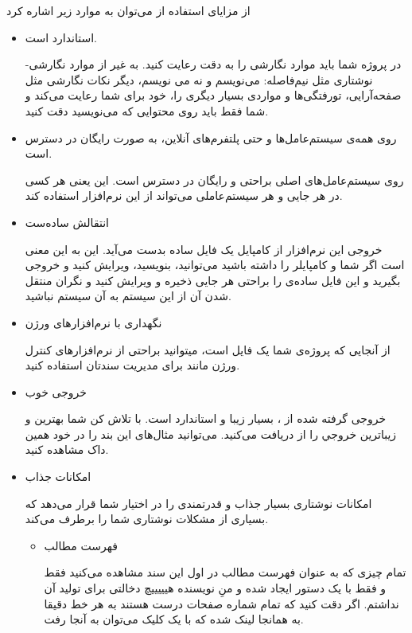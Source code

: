   از مزایای استفاده از \lr{\LaTeX } می‌توان به موارد زیر اشاره کرد
  \begin{itemize}
  	\item 
  	{\large استاندارد است.}
  	
  	در پروژه شما باید موارد نگارشی را به دقت رعایت کنید. به غیر از موارد نگارشی-نوشتاری مثل نیم‌فاصله:‌ می‌‌نویسم و نه می نویسم، دیگر نکات نگارشی مثل صفحه‌آرایی، تورفتگی‌ها و مواردی بسیار دیگری را، خود \lr{\LaTeX } برای شما رعایت می‌کند و شما فقط باید روی محتوایی که می‌نویسید دقت کنید.
  	\item 
    {\large روی همه‌ی سیستم‌عامل‌ها و حتی پلتفرم‌های آنلاین، به صورت رایگان در دسترس است.}
    
    \lr{\LaTeX }
     روی سیستم‌عامل‌های اصلی 
     براحتی و رایگان در دسترس است. این یعنی هر کسی در هر جایی و هر سیستم‌عاملی می‌تواند از این نرم‌افزار استفاده کند.
  	\item 
  	{\large انتقالش ساده‌ست}
  	
  	خروجی این نرم‌افزار از کامپایل یک فایل  ساده بدست می‌آید. این به این معنی است اگر شما  و کامپایلر 
  	\lr{\LaTeX}
  	را داشته باشید می‌توانید، بنویسید، ویرایش کنید و خروجی بگیرید و این فایل ساده‌ی  را براحتی هر جایی ذخیره و ویرایش کنید و نگران منتقل شدن آن از این سیستم به آن سیستم نباشید.
  	
  	\item 
  	{\large نگهداری با نرم‌افزار‌های ورژن}
  	
  	از آنجایی که  پروژه‌ی شما یک فایل  است، میتوانید براحتی از نرم‌افزار‌های کنترل ورژن مانند  برای مدیریت سندتان استفاده کنید.
  	
  	\item 
  	{\large خروجی خوب}
  	
  	خروجی گرفته شده از 
  	\lr{\LaTeX }،
  	 بسیار زیبا و استاندارد است. با تلاش کن شما بهترین و زیبا‌ترین خروجي را از 
  	 \lr{\LaTeX }
  	 دریافت می‌کنید. می‌توانید مثال‌های این بند را در خود همین داک مشاهده‌ کنید.
  	 
  	\item {\large امکانات جذاب}
  	
  	\lr{\LaTeX }
  	امکانات نوشتاری بسیار جذاب و قدرتمندی را در اختیار شما قرار می‌دهد که بسیاری از مشکلات نوشتاری شما را برطرف می‌کند.
  	
  	\begin{itemize}
  		\item فهرست مطالب
		
		تمام چیزی که به عنوان فهرست مطالب در اول این سند مشاهده می‌کنید فقط و فقط با یک دستور ایجاد شده و منِ نویسنده هیییییچ دخالتی برای تولید آن نداشتم. اگر دقت کنید که تمام شماره‌ صفحات درست هستند به هر خط دقیقا به همانجا لینک شده که با یک کلیک می‌توان به آنجا رفت.
		

\end{itemize}
\end{itemize}

